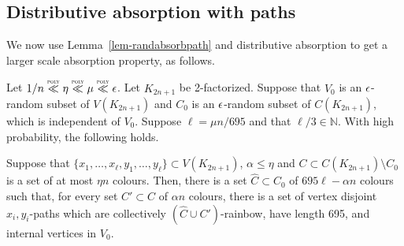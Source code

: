 \subsection{Distributive absorption with paths}

We now use Lemma~\ref{lem-randabsorbpath} and distributive absorption to get a larger scale absorption property, as follows.

\begin{lemma}\label{absorbBmacro} Let $1/n\ll \eta \ll \mu\ll \eps$. Let $K_{2n+1}$ be 2-factorized. Suppose that $V_0$ is an $\epsilon$-random subset of $V(K_{2n+1})$ and $C_0$ is an $\epsilon$-random subset of $C(K_{2n+1})$, which is independent of $V_0$. Suppose $\ell=\mu n/695$ and that $\ell/3\in \mathbb{N}$. With high probability, the following holds.

Suppose that $\{x_1,\ldots,x_{\ell},y_1,\ldots,y_\ell\}\subset V(K_{2n+1})$, $\alpha\leq \eta$ and $C\subset C(K_{2n+1})\setminus C_0$ is a set of at most $\eta n$ colours. Then, there is a set $\hat{C}\subset C_0$ of $695\ell-\alpha n$ colours such that, for every set $C'\subset C$ of $\alpha n$ colours, there is a set of vertex disjoint $x_i,y_i$-paths which are collectively $(\hat{C}\cup C')$-rainbow, have length 695, and internal vertices in $V_0$.
\end{lemma}
